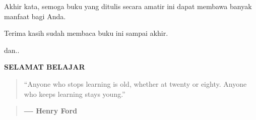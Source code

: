 \documentclass[openany]{book}
\begin{document}
Akhir kata, semoga buku yang ditulis secara amatir ini dapat membawa
banyak manfaat bagi Anda.

Terima kasih sudah membaca buku ini sampai akhir.

dan..

\textbf{SELAMAT BELAJAR}

\begin{quote}
``Anyone who stops learning is old, whether at twenty or eighty. Anyone
who keeps learning stays young.''
\end{quote}

\begin{quote}
―- \textbf{Henry Ford}
\end{quote}


\end{document}
